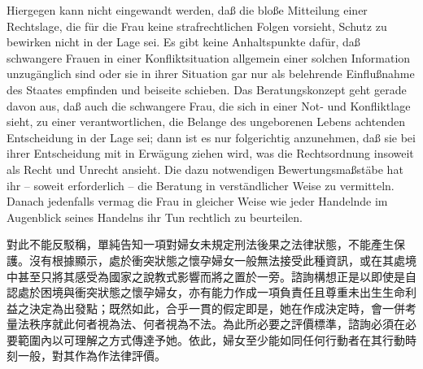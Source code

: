 \documentclass[12pt]{article}
\begin{document}
\begin{sourcepara}[title={原文D.114}]
Hiergegen kann nicht eingewandt werden, daß die bloße Mitteilung einer Rechtslage, die für die Frau keine strafrechtlichen Folgen vorsieht, Schutz zu bewirken nicht in der Lage sei. Es gibt keine Anhaltspunkte dafür, daß schwangere Frauen in einer Konfliktsituation allgemein einer solchen Information unzugänglich sind oder sie in ihrer Situation gar nur als belehrende Einflußnahme des Staates empfinden und beiseite schieben. Das Beratungskonzept geht gerade davon aus, daß auch die schwangere Frau, die sich in einer Not- und Konfliktlage sieht, zu einer verantwortlichen, die Belange des ungeborenen Lebens achtenden Entscheidung in der Lage sei; dann ist es nur folgerichtig anzunehmen, daß sie bei ihrer Entscheidung mit in Erwägung ziehen wird, was die Rechtsordnung insoweit als Recht und Unrecht ansieht. Die dazu notwendigen Bewertungsmaßstäbe hat ihr -- soweit erforderlich -- die Beratung in verständlicher Weise zu vermitteln. Danach jedenfalls vermag die Frau in gleicher Weise wie jeder Handelnde im Augenblick seines Handelns ihr Tun rechtlich zu beurteilen.
\end{sourcepara}
\begin{transpara}
對此不能反駁稱，單純告知一項對婦女未規定刑法後果之法律狀態，不能產生保護。沒有根據顯示，處於衝突狀態之懷孕婦女一般無法接受此種資訊，或在其處境中甚至只將其感受為國家之說教式影響而將之置於一旁。諮詢構想正是以即使是自認處於困境與衝突狀態之懷孕婦女，亦有能力作成一項負責任且尊重未出生生命利益之決定為出發點；既然如此，合乎一貫的假定即是，她在作成決定時，會一併考量法秩序就此何者視為法、何者視為不法。為此所必要之評價標準，諮詢必須在必要範圍內以可理解之方式傳達予她。依此，婦女至少能如同任何行動者在其行動時刻一般，對其作為作法律評價。
\end{transpara}
\end{document}

